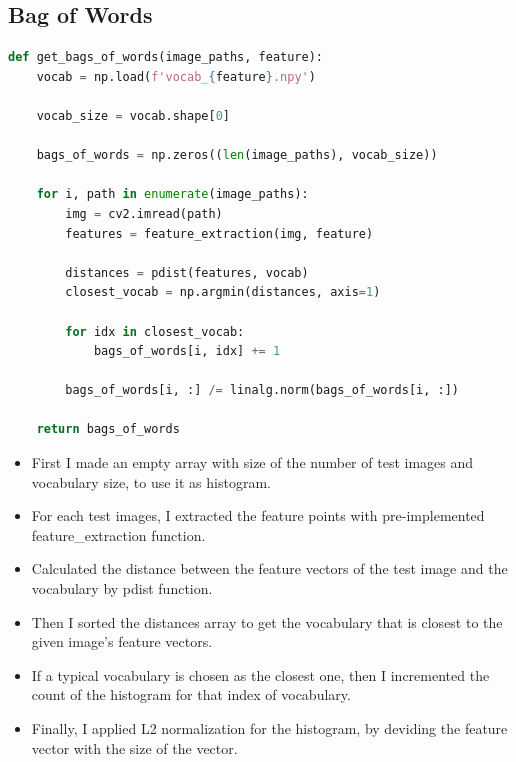 \subsection*{Bag of Words}
\begin{lstlisting}[language=python]
def get_bags_of_words(image_paths, feature):
    vocab = np.load(f'vocab_{feature}.npy')

    vocab_size = vocab.shape[0]

    bags_of_words = np.zeros((len(image_paths), vocab_size))

    for i, path in enumerate(image_paths):
        img = cv2.imread(path)
        features = feature_extraction(img, feature)

        distances = pdist(features, vocab)
        closest_vocab = np.argmin(distances, axis=1)

        for idx in closest_vocab:
            bags_of_words[i, idx] += 1

        bags_of_words[i, :] /= linalg.norm(bags_of_words[i, :])

    return bags_of_words
\end{lstlisting}
\begin{itemize}
    \item First I made an empty array with size of the number of test images and vocabulary size, to use it as histogram.
    \item For each test images, I extracted the feature points with pre-implemented feature\_extraction function.
    \item Calculated the distance between the feature vectors of the test image and the vocabulary by pdist function.
    \item Then I sorted the distances array to get the vocabulary that is closest to the given image's feature vectors.
    \item If a typical vocabulary is chosen as the closest one, then I incremented the count of the histogram for that index of vocabulary.
    \item Finally, I applied L2 normalization for the histogram, by deviding the feature vector with the size of the vector.
\end{itemize}
